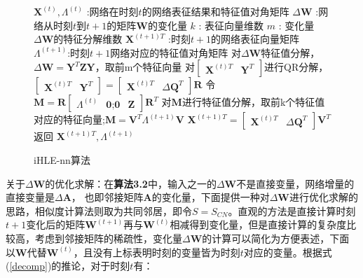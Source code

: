 \begin{figure}[htb]
	\centering
	\begin{minipage}{.7\linewidth}
		\begin{algorithm}[H]\label{iHLE_nn}
			\small
			\caption{iHLE-nn算法}
			\begin{algorithmic}[1]
				\Require
				\Statex $\textbf{X} ^{(t)},\Lambda^{(t)}$ :网络在时刻$t$的网络表征结果和特征值对角矩阵
				\Statex $\Delta\textbf{W}$ :网络从时刻$t$到$t+1$的矩阵$\textbf{W}$的变化量
				\Statex $k$ : 表征向量维数
				\Statex $m$ : 变化量$\Delta\textbf{W}$的特征分解维数
				\Ensure
				\Statex $\textbf{X}^{(t+1)T}$ :时刻$t+1$的网络表征向量矩阵
				\Statex $\Lambda^{(t+1)}$:时刻$t+1$网络对应的特征值对角矩阵
				\Statex
				\State 对$\Delta\textbf{W}$特征值分解，$\Delta\textbf{W} =  \textbf{Y}^{T} \textbf{Z}  \textbf{Y}$，取前m个特征向量
				\State 对$\begin{bmatrix} \textbf{X}^{(t)T} & \textbf{Y}^{T}\end{bmatrix}$进行QR分解，$\begin{bmatrix} \textbf{X}^{(t)T} & \textbf{Y}^{T}\end{bmatrix} = \begin{bmatrix} \textbf{X}^{(t)T} & \Delta\textbf{Q}^{T} \end{bmatrix} \textbf{R}$
				\State 令$\textbf{M} = \textbf{R}\begin{bmatrix}  \Lambda^{(t)} & \textbf{0};
				\textbf{0} & \textbf{Z} \end{bmatrix}
				\textbf{R}^T$
				\State 对$\textbf{M}$进行特征值分解，取前k个特征值对应的特征向量;$\textbf{M} =\textbf{V}^T \Lambda^{(t+1)} \textbf{V}$
				\State $\textbf{X}^{(t+1)T} = \begin{bmatrix} \textbf{X}^{(t)T} & \Delta\textbf{Q}^{T} \end{bmatrix} \textbf{V}^T$
				\State 返回 $\textbf{X}^{(t+1)T}, \Lambda^{(t+1)}$
			\end{algorithmic}
		\end{algorithm}
	\end{minipage}
\end{figure}


\remark 关于$\Delta\textbf{W}$的优化求解：在\textbf{算法3.2}中，输入之一的$\Delta\textbf{W}$不是直接变量，网络增量的直接变量是$\Delta\textbf{A}$， 也即邻接矩阵$\textbf{A}$的变化量，下面提供一种对$\Delta\textbf{W}$进行优化求解的思路，相似度计算法则取为共同邻居，即令$S=S_{CN}$。直观的方法是直接计算时刻$t+1$变化后的矩阵$\textbf{W}^{(t+1)}$再与$\textbf{W}^{(t)}$相减得到变化量，但是直接计算的复杂度比较高，考虑到邻接矩阵的稀疏性，变化量$\Delta\textbf{W}$的计算可以简化为方便表述，下面以$\textbf{W}$代替$\textbf{W}^{(t)}$，且没有上标表明时刻的变量皆为时刻$t$对应的变量。根据式(\ref{decomp})的推论，对于时刻$t$有：

